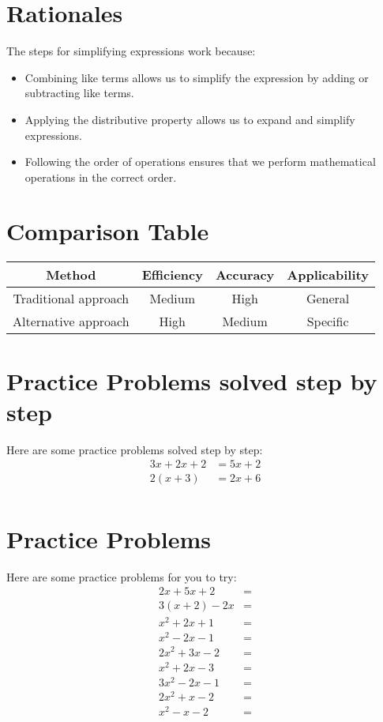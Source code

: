 \documentclass{article}
\begin{document}
\section{Rationales}
The steps for simplifying expressions work because:
\begin{itemize}
\item Combining like terms allows us to simplify the expression by adding or subtracting like terms.
\item Applying the distributive property allows us to expand and simplify expressions.
\item Following the order of operations ensures that we perform mathematical operations in the correct order.
\end{itemize}

\section{Comparison Table}
\begin{center}
\begin{tabular}{|c|c|c|c|}
\hline Method & Efficiency & Accuracy & Applicability \\
\hline Traditional approach & Medium & High & General \\
\hline Alternative approach & High & Medium & Specific \\
\hline
\end{tabular}
\end{center}

\section{Practice Problems solved step by step}
Here are some practice problems solved step by step:
\begin{align*}
3x + 2x + 2 &= 5x + 2 \\
2(x + 3) &= 2x + 6 \\
\end{align*}

\section{Practice Problems}
Here are some practice problems for you to try:
\begin{align*}
2x + 5x + 2 &= \\
3(x + 2) - 2x &= \\
x^2 + 2x + 1 &= \\
x^2 - 2x - 1 &= \\
2x^2 + 3x - 2 &= \\
x^2 + 2x - 3 &= \\
3x^2 - 2x - 1 &= \\
2x^2 + x - 2 &= \\
x^2 - x - 2 &= \\
\end{align*}
\end{document}
